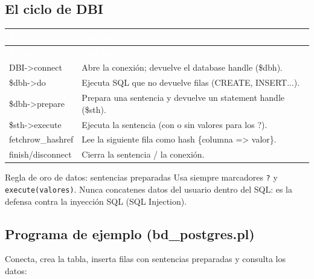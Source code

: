 \documentclass[11pt]{article}
\begin{document}
\subsection{El ciclo de DBI}
{\renewcommand{\arraystretch}{1.25}
\begin{longtable}{>{\raggedright\arraybackslash}p{3.4cm} >{\raggedright\arraybackslash}p{12cm}}
\rowcolor{uteqverde}\textcolor{white}{\textbf{Método}} & \textcolor{white}{\textbf{Qué hace}} \\
\endfirsthead
\rowcolor{uteqverde}\textcolor{white}{\textbf{Método}} & \textcolor{white}{\textbf{Qué hace}} \\
\endhead
\ttfamily\color{uteqverde}DBI-\textgreater{}connect & Abre la conexión; devuelve el database handle (\$dbh). \\ \hline
\ttfamily\color{uteqverde}\$dbh-\textgreater{}do & Ejecuta SQL que no devuelve filas (CREATE, INSERT...). \\ \hline
\ttfamily\color{uteqverde}\$dbh-\textgreater{}prepare & Prepara una sentencia y devuelve un statement handle (\$sth). \\ \hline
\ttfamily\color{uteqverde}\$sth-\textgreater{}execute & Ejecuta la sentencia (con o sin valores para los ?). \\ \hline
\ttfamily\color{uteqverde}fetchrow\_hashref & Lee la siguiente fila como hash \{columna =\textgreater{} valor\}. \\ \hline
\ttfamily\color{uteqverde}finish/disconnect & Cierra la sentencia / la conexión. \\ \hline
\end{longtable}}
\begin{cajatip}{Regla de oro de datos: sentencias preparadas}
Usa siempre marcadores \texttt{?} y \texttt{execute(valores)}. Nunca concatenes datos del usuario dentro del SQL: es la defensa contra la inyección SQL (SQL Injection).\par
\end{cajatip}
\subsection{Programa de ejemplo (bd\_postgres.pl)}
Conecta, crea la tabla, inserta filas con sentencias preparadas y consulta los datos:
\end{document}
